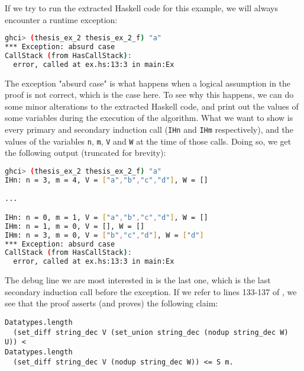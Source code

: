 If we try to run the extracted Haskell code for this example,
we will always encounter a runtime exception:

\begin{minipage}{\linewidth}
\begin{lstlisting}[language=bash, label={lst:thm_32_haskell_output_extended}, caption={Output of \lstinline{thm_32} example extended}]
ghci> (thesis_ex_2 thesis_ex_2_f) "a"
*** Exception: absurd case
CallStack (from HasCallStack):
  error, called at ex.hs:13:3 in main:Ex
\end{lstlisting}
\end{minipage}

The exception "absurd case" is what happens when a logical assumption in the proof
is not correct, which is the case here.
To see why this happens, we can do some minor alterations to the extracted Haskell code,
and print out the values of some variables during the execution of the algorithm.
What we want to show is every primary and secondary induction call (\lstinline{IHn} and \lstinline{IHm} respectively),
and the values of the variables \lstinline{n}, \lstinline{m}, \lstinline{V} and \lstinline{W} at the time of those calls.
Doing so, we get the following output (truncated for brevity):

\begin{minipage}{\linewidth}
\begin{lstlisting}[language=bash, label={lst:thm_32_haskell_output_extended_debug}, caption={Output of \lstinline{thm_32} example extended, with debug}]
ghci> (thesis_ex_2 thesis_ex_2_f) "a"
IHn: n = 3, m = 4, V = ["a","b","c","d"], W = []

...

IHn: n = 0, m = 1, V = ["a","b","c","d"], W = []
IHm: n = 1, m = 0, V = [], W = []
IHm: n = 3, m = 0, V = ["b","c","d"], W = ["d"]
*** Exception: absurd case
CallStack (from HasCallStack):
  error, called at ex.hs:13:3 in main:Ex
\end{lstlisting}
\end{minipage}

The debug line we are most interested in is the last one,
which is the last secondary induction call before the exception.
If we refer to lines 133-137 of ,
we see that the proof asserts (and proves) the following claim:

\begin{minipage}{\linewidth}
\begin{lstlisting}[language=Coq, label={lst:thm_32_false_claim}, caption={False claim in \lstinline{thm_32} proof}]
Datatypes.length
  (set_diff string_dec V (set_union string_dec (nodup string_dec W) U)) <
Datatypes.length
  (set_diff string_dec V (nodup string_dec W)) <= S m.
\end{lstlisting}
\end{minipage}

